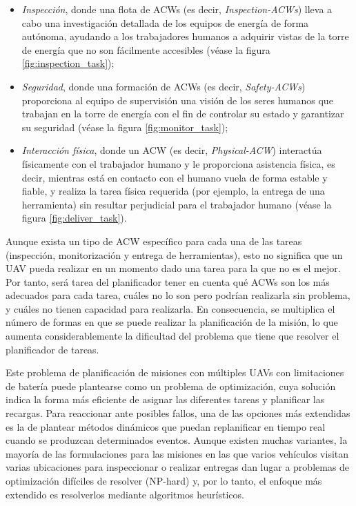 \documentclass[fontsize=11pt, English=false, Español=true, Myfinal=true, twoside, numbers=noenddot]{scrbook}
\begin{document}
\begin{itemize}
    \item \textit{Inspección}, donde una flota de \glspl{ACW} (es decir, \textit{Inspection-ACWs}) lleva a cabo una investigación detallada de los equipos de energía de forma autónoma, ayudando a los trabajadores humanos a adquirir vistas de la torre de energía que no son fácilmente accesibles (véase la figura \ref{fig:inspection_task});
    \item \textit{Seguridad}, donde una formación de \glspl{ACW} (es decir, \textit{Safety-ACWs}) proporciona al equipo de supervisión una visión de los seres humanos que trabajan en la torre de energía con el fin de controlar su estado y garantizar su seguridad (véase la figura \ref{fig:monitor_task});
    \item \textit{Interacción física}, donde un \gls{ACW} (es decir, \textit{Physical-ACW}) interactúa físicamente con el trabajador humano y le proporciona asistencia física, es decir, mientras está en contacto con el humano vuela de forma estable y fiable, y realiza la tarea física requerida (por ejemplo, la entrega de una herramienta) sin resultar perjudicial para el trabajador humano (véase la figura \ref{fig:deliver_task}).
\end{itemize} 

Aunque exista un tipo de \gls{ACW} específico para cada una de las tareas (inspección, monitorización y entrega de herramientas), esto no significa que un \gls{UAV} pueda realizar en un momento dado una tarea para la que no es el mejor. Por tanto, será tarea del planificador tener en cuenta qué \glspl{ACW} son los más adecuados para cada tarea, cuáles no lo son pero podrían realizarla sin problema, y cuáles no tienen capacidad para realizarla. En consecuencia, se multiplica el número de formas en que se puede realizar la planificación de la misión, lo que aumenta considerablemente la dificultad del problema que tiene que resolver el planificador de tareas.

Este problema de planificación de misiones con múltiples \glspl{UAV} con limitaciones de batería puede plantearse como un problema de optimización, cuya solución indica la forma más eficiente de asignar las diferentes tareas y planificar las recargas. Para reaccionar ante posibles fallos, una de las opciones más extendidas es la de plantear métodos dinámicos que puedan replanificar en tiempo real cuando se produzcan determinados eventos. Aunque existen muchas variantes, la mayoría de las formulaciones para las misiones en las que varios vehículos visitan varias ubicaciones para inspeccionar o realizar entregas dan lugar a problemas de optimización difíciles de resolver (NP-hard) y, por lo tanto, el enfoque más extendido es resolverlos mediante algoritmos heurísticos.
\end{document}
